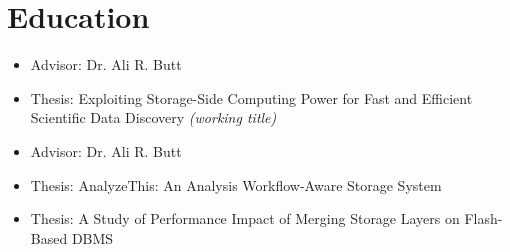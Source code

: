 \section{Education}

\begin{itemize}
\item {\small Advisor: Dr. Ali R. Butt}
\item {\small Thesis: Exploiting Storage-Side Computing Power for Fast and Efficient Scientific Data Discovery
            {\footnotesize{\it(working title)}}}
\end{itemize}

\begin{itemize}
\item {\small Advisor: Dr. Ali R. Butt}
\item {\small Thesis: AnalyzeThis: An Analysis Workflow-Aware Storage System}
\end{itemize}

\begin{itemize}
\item {\small Thesis: A Study of Performance Impact of Merging Storage Layers on Flash-Based DBMS}
\end{itemize}


